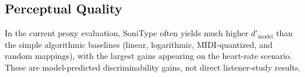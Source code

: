 \documentclass[sigchi, nonacm]{acmart}
\begin{document}
\subsection{Perceptual Quality}



In the current proxy evaluation, SoniType often yields much higher $d'_\mathrm{model}$ than the simple algorithmic baselines (linear, logarithmic, MIDI-quantized, and random mappings), with the largest gains appearing on the heart-rate scenario. These are model-predicted discriminability gains, not direct listener-study results.
\end{document}
